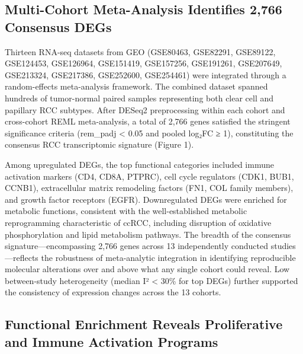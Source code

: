 \documentclass[
  12pt,
]{article}
\begin{document}
\subsection{Multi-Cohort Meta-Analysis Identifies 2,766 Consensus
DEGs}\label{multi-cohort-meta-analysis-identifies-2766-consensus-degs}

Thirteen RNA-seq datasets from GEO (GSE80463, GSE82291, GSE89122,
GSE124453, GSE126964, GSE151419, GSE157256, GSE191261, GSE207649,
GSE213324, GSE217386, GSE252600, GSE254461) were integrated through a
random-effects meta-analysis framework. The combined dataset spanned
hundreds of tumor-normal paired samples representing both clear cell and
papillary RCC subtypes. After DESeq2 preprocessing within each cohort
and cross-cohort REML meta-analysis, a total of 2,766 genes satisfied
the stringent significance criteria (rem\_padj \textless{} 0.05 and
\textbar pooled log₂FC\textbar{} ≥ 1), constituting the consensus RCC
transcriptomic signature (Figure 1).

Among upregulated DEGs, the top functional categories included immune
activation markers (CD4, CD8A, PTPRC), cell cycle regulators (CDK1,
BUB1, CCNB1), extracellular matrix remodeling factors (FN1, COL family
members), and growth factor receptors (EGFR). Downregulated DEGs were
enriched for metabolic functions, consistent with the well-established
metabolic reprogramming characteristic of ccRCC, including disruption of
oxidative phosphorylation and lipid metabolism pathways. The breadth of
the consensus signature---encompassing 2,766 genes across 13
independently conducted studies---reflects the robustness of
meta-analytic integration in identifying reproducible molecular
alterations over and above what any single cohort could reveal. Low
between-study heterogeneity (median I² \textless{} 30\% for top DEGs)
further supported the consistency of expression changes across the 13
cohorts.

\subsection{Functional Enrichment Reveals Proliferative and Immune
Activation
Programs}\label{functional-enrichment-reveals-proliferative-and-immune-activation-programs}
\end{document}
